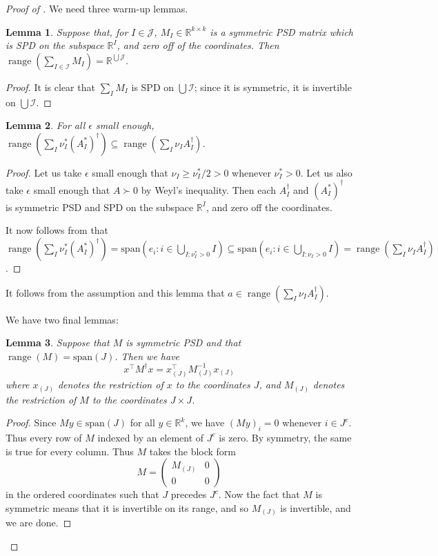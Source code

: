 \documentclass{article} %
\newcommand{\R}{\mathbb{R}}
\DeclareMathOperator{\supp}{supp}
\DeclareMathOperator{\range}{range}
\newtheorem{lemma}[lemma]{Lemma}
\begin{document}
\begin{proof}[Proof of ]
We need three warm-up lemmas.

\begin{lemma}\label{lemma:l1}
    Suppose that, for $I\in\mathcal{J}$, $M_I\in\R^{k\times k}$ is a symmetric PSD matrix which is SPD on the subspace $\R^I$, and zero off of the coordinates. Then $\range(\sum_{I\in\mathcal{I}} M_I)=\R^{\bigcup \mathcal{J}}$.
\end{lemma}
\begin{proof}
    It is clear that $\sum_I M_I$ is SPD on $\bigcup \mathcal{I}$; since it is symmetric, it is invertible on $\bigcup\mathcal{I}$.
\end{proof}

\begin{lemma}\label{lemma:l2}
        For all $\epsilon$ small enough, $\range(\sum_I \nu_I^*(A_I^*)^\dagger)\subseteq \range(\sum_I \nu_IA_I^\dagger)$.
\end{lemma}
\begin{proof}
    Let us take $\epsilon$ small enough that $\nu_I\geq \nu_I^*/2>0$ whenever $\nu_I^*>0$. Let us also take $\epsilon$ small enough that $A\succ0$ by Weyl's inequality. Then each $A_I^\dagger$ and $(A_I^*)^\dagger$ is symmetric PSD and SPD on the subspace $\R^I$, and zero off the coordinates.
    
    It now follows from  that $\range(\sum_I \nu_I^*(A^*_I)^\dagger) = \text{span}(e_i:i\in\bigcup_{I:\nu_I^*>0}I)\subseteq \text{span}(e_i:i\in\bigcup_{I:\nu_I>0} I)=\range(\sum_I \nu_I A_I^\dagger)$.
\end{proof}

It follows from the assumption and this lemma that $a\in\range(\sum_I \nu_I A_I^\dagger)$.


We have two final lemmas:

\begin{lemma}\label{lemma:l3}
    Suppose that $M$ is symmetric PSD and that $\range(M)=\text{span}(J)$. Then we have
    \[
    x^\top M^\dagger x = x_{(J)}^\top M_{(J)}^{-1} x_{(J)}
    \]
    where $x_{(J)}$ denotes the restriction of $x$ to the coordinates $J$, and $M_{(J)}$ denotes the restriction of $M$ to the coordinates $J\times J$.
\end{lemma}
\begin{proof}
    Since $My\in \text{span}(J)$ for all $y\in\R^k$, we have $(My)_i=0$ whenever $i\in J^c$. Thus every row of $M$ indexed by an element of $J^c$ is zero. By symmetry, the same is true for every column. Thus $M$ takes the block form
    \[
    M = \begin{pmatrix}
        M_{(J)} &0 \\
        0 & 0
    \end{pmatrix}
    \]
    in the ordered coordinates such that $J$ precedes $J^c$. Now the fact that $M$ is symmetric means that it is invertible on its range, and so $M_{(J)}$ is invertible, and we are done. 
\end{proof}


\end{proof}
\end{document}
